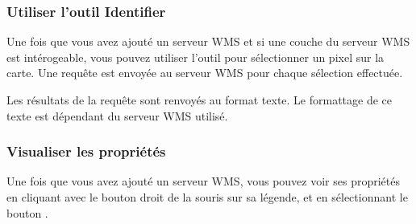 \subsubsection{Utiliser l'outil Identifier}\label{sec:ogc-wms-identify}

Une fois que vous avez ajouté un serveur WMS et si une couche du serveur WMS
est intérogeable, vous pouvez utiliser l'outil 
 pour sélectionner un pixel sur la
carte. Une requête est envoyée au serveur WMS pour chaque sélection effectuée.

Les résultats de la requête sont renvoyés au format texte. Le formattage de ce
texte est dépendant du serveur WMS utilisé.


\subsubsection{Visualiser les propriétés}
\label{sec:ogc-wms-properties}

Une fois que vous avez ajouté un serveur WMS, vous pouvez voir ses propriétés
en cliquant avec le bouton droit de la souris sur sa légende, et en
sélectionnant le bouton  .

\label{sec:ogc-wms-properties-metadata}

